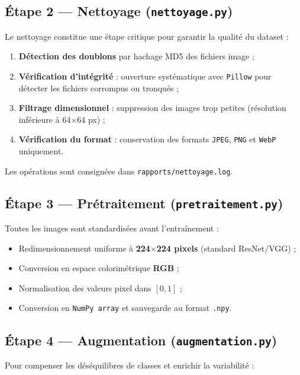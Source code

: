 \documentclass[12pt,a4paper]{article}
\begin{document}
\subsection{Étape 2 — Nettoyage (\texttt{nettoyage.py})}

Le nettoyage constitue une étape critique pour garantir la qualité du dataset :

\begin{enumerate}[noitemsep]
  \item \textbf{Détection des doublons} par hachage MD5 des fichiers image ;
  \item \textbf{Vérification d'intégrité} : ouverture systématique avec \texttt{Pillow}
        pour détecter les fichiers corrompus ou tronqués ;
  \item \textbf{Filtrage dimensionnel} : suppression des images trop petites
        (résolution inférieure à 64\(\times\)64 px) ;
  \item \textbf{Vérification du format} : conservation des formats \texttt{JPEG},
        \texttt{PNG} et \texttt{WebP} uniquement.
\end{enumerate}

Les opérations sont consignées dans \texttt{rapports/nettoyage.log}.

\subsection{Étape 3 — Prétraitement (\texttt{pretraitement.py})}

Toutes les images sont standardisées avant l'entraînement :

\begin{itemize}[noitemsep]
  \item Redimensionnement uniforme à \textbf{224\(\times\)224 pixels} (standard ResNet/VGG) ;
  \item Conversion en espace colorimétrique \textbf{RGB} ;
  \item Normalisation des valeurs pixel dans \([0, 1]\) ;
  \item Conversion en \texttt{NumPy array} et sauvegarde au format \texttt{.npy}.
\end{itemize}

\subsection{Étape 4 — Augmentation (\texttt{augmentation.py})}

Pour compenser les déséquilibres de classes et enrichir la variabilité :
\end{document}
